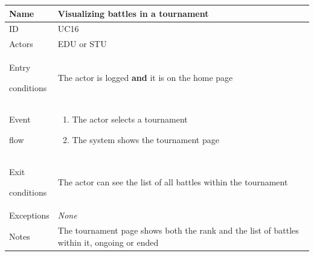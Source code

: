 \begin{center}
    \def\arraystretch{1.5}
    \begin{tabular}{| m{2cm} | m{10cm}|}
        \hline
        Name                  & Visualizing battles in a tournament                                                         \\ \hline
        ID                    & UC16                                                                                        \\ \hline
        Actors                & EDU or STU                                                                                  \\ \hline
        Entry \par conditions & The actor is logged \textbf{and} it is on the home page                                     \\ \hline
        Event \par flow       & \begin{enumerate}
                                    \item The actor selects a tournament
                                    \item The system shows the tournament page
                                \end{enumerate}                                                   \\ \hline
        Exit \par conditions  & The actor can see the list of all battles within the tournament                             \\ \hline
        Exceptions            & \textit{None}                                                                               \\ \hline
        Notes                 & The tournament page shows both the rank and the list of battles within it, ongoing or ended \\ \hline
    \end{tabular}
\end{center}

